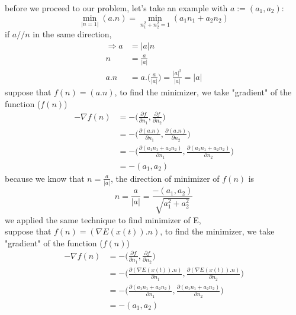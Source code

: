 \documentclass[a4paper,11pt]{article}
\begin{document}
before we proceed to our problem, let's take an example with $a:=(a_1,a_2)$:
\begin{equation}
\min_{|n=1|}(a.n) = \min_{n_1^2 + n_2^2 = 1}(a_1n_1 + a_2n_2)
\end{equation}
if $a//n$ in the same direction,
\begin{equation}
\begin{aligned}
\Rightarrow a &= |a|n\\
n&=\frac{a}{|a|}\\
a.n &= a.\bigg(\frac{a}{|a|}\bigg) =\frac{|a|^2}{|a|} = |a|
\end{aligned}
\end{equation}
suppose that $f(n) = (a.n)$, to find the minimizer, we take "gradient" of the function ($f(n)$)
\begin{equation}
\begin{aligned}
-\nabla f(n) &= - \bigg(\frac{\partial f}{\partial n_1}, \frac{\partial f}{\partial n_2} \bigg)\\
&= - \bigg( \frac{\partial (a.n)}{\partial n_1}, \frac{\partial (a.n)}{\partial n_2} \bigg)\\
&= - \bigg( \frac{\partial (a_1n_1 + a_2n_2)}{\partial n_1}, \frac{\partial (a_1n_1 + a_2n_2)}{\partial n_2} \bigg)\\
&= - (a_1,a_2)
\end{aligned}
\end{equation}
because we know that $n=\frac{a}{|a|}$, the direction of minimizer of $f(n)$ is
\begin{equation}
n = \frac{a}{|a|} = \frac{-(a_1,a_2)}{\sqrt{a_1^2 + a_2^2}}
\end{equation}
we applied the same technique to find minimizer of E,\\
suppose that $f(n) = (\nabla E(x(t)).n)$, to find the minimizer, we take "gradient" of the function ($f(n)$)
\begin{equation}
\begin{aligned}
-\nabla f(n) &= - \bigg(\frac{\partial f}{\partial n_1}, \frac{\partial f}{\partial n_2} \bigg)\\
&= - \bigg( \frac{\partial (\nabla E(x(t)).n)}{\partial n_1}, \frac{\partial (\nabla E(x(t)).n)}{\partial n_2} \bigg)\\
&= - \bigg( \frac{\partial (a_1n_1 + a_2n_2)}{\partial n_1}, \frac{\partial (a_1n_1 + a_2n_2)}{\partial n_2} \bigg)\\
&= - (a_1,a_2)
\end{aligned}
\end{equation}
\end{document}
